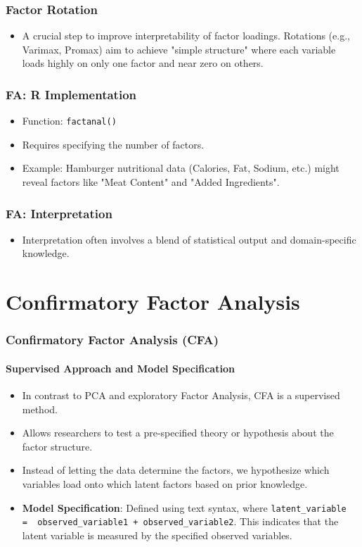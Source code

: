 \documentclass{beamer}
\newcommand{\code}[1]{\texttt{#1}}
\begin{document}
\begin{frame}
    \frametitle{Factor Rotation}
    \begin{itemize}
        \item A crucial step to improve interpretability of factor loadings. Rotations (e.g., Varimax, Promax) aim to achieve "simple structure" where each variable loads highly on only one factor and near zero on others.
    \end{itemize}
\end{frame}

\begin{frame}
    \frametitle{FA: R Implementation}
    \begin{itemize}
        \item Function: \code{factanal()}
        \item Requires specifying the number of factors.
        \item Example: Hamburger nutritional data (Calories, Fat, Sodium, etc.) might reveal factors like "Meat Content" and "Added Ingredients".
    \end{itemize}
\end{frame}

\begin{frame}
    \frametitle{FA: Interpretation}
    \begin{itemize}
        \item Interpretation often involves a blend of statistical output and domain-specific knowledge.
    \end{itemize}
\end{frame}

\section{Confirmatory Factor Analysis}

\begin{frame}
    \frametitle{Confirmatory Factor Analysis (CFA)}
    \framesubtitle{Supervised Approach and Model Specification}
    \begin{itemize}
        \item In contrast to PCA and exploratory Factor Analysis, CFA is a \alert{supervised} method.
        \item Allows researchers to \alert{test a pre-specified theory} or hypothesis about the factor structure.
        \item Instead of letting the data determine the factors, we hypothesize which variables load onto which latent factors based on prior knowledge.
    \item \textbf{Model Specification}: Defined using text syntax, where \texttt{latent\_variable =~ observed\_variable1 + observed\_variable2}. This indicates that the latent variable is measured by the specified observed variables.
    \end{itemize}
\end{frame}
\end{document}
